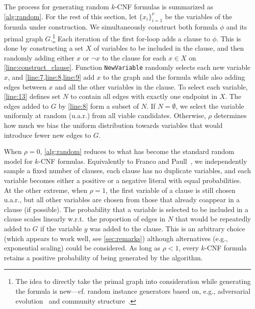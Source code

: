 \documentclass[runningheads]{llncs}
\begin{document}
The process for generating random $k$-CNF formulas is summarized as
\cref{alg:random}. For the rest of this section, let ${\{x_{i}\}}_{i=1}^{\nu}$
be the variables of the formula under construction. We simultaneously construct
both formula $\phi$ and its primal graph $G$.\footnote{The idea to directly take
  the primal graph into consideration while generating the formula is new---cf.
  random \SAT{} instance generators based on, e.g., adversarial
  evolution~\cite{DBLP:conf/cec/HossainALA10} and community
  structure~\cite{DBLP:journals/ai/Giraldez-CruL16}.} Each iteration of the
first for-loop adds a clause to $\phi$. This is done by constructing a set $X$
of variables to be included in the clause, and then randomly adding either $x$
or $\neg x$ to the clause for each $x \in X$ on \cref{line:construct_clause}.
Function \texttt{NewVariable} randomly selects each new variable $x$, and
\cref{line:7,line:8,line:9} add $x$ to the graph and the formula while also
adding edges between $x$ and all the other variables in the clause. To select
each variable, \cref{line:13} defines set $N$ to contain all edges with exactly
one endpoint in $X$. The edges added to $G$ by \cref{line:8} form a subset of
$N$. If $N = \emptyset$, we select the variable uniformly at random (u.a.r.)
from all viable candidates. Otherwise, $\rho$ determines how much we bias the
uniform distribution towards variables that would introduce fewer new edges to
$G$.

When $\rho=0$, \cref{alg:random} reduces to what has become the standard random
model for $k$-CNF formulas. Equivalently to
Franco and Paull~\cite{DBLP:journals/dam/FrancoP83},
we independently sample a fixed number of clauses, each clause has no duplicate
variables, and each variable becomes either a positive or a negative literal
with equal probabilities. At the other extreme, when $\rho = 1$, the first
variable of a clause is still chosen u.a.r., but all other variables are chosen
from those that already coappear in a clause (if possible). The probability that
a variable is selected to be included in a clause scales linearly w.r.t.\ the
proportion of edges in $N$ that would be repeatedly added to $G$ if the variable
$y$ was added to the clause. This is an arbitrary choice (which appears to work
well, see \cref{sec:remarks}) although alternatives (e.g., exponential scaling)
could be considered. As long as $\rho < 1$, every $k$-CNF formula retains a
positive probability of being generated by the algorithm.
\end{document}
